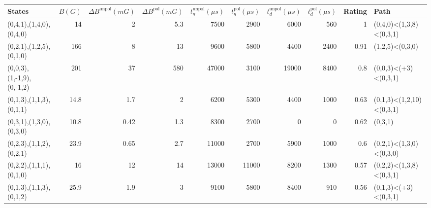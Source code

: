 \begin{tabular}{lrrrrrrrrl}
\hline
 {States}                  &   {$B(G)$} &   {$\Delta B^{\text{unpol}}(mG)$} &   {$\Delta B^{\text{pol}}(mG)$} &   {$t^{\text{unpol}}_{g}(\mu s)$} &   {$t^{\text{pol}}_{g}(\mu s)$} &   {$t^{\text{unpol}}_{d}(\mu s)$} &   {$t^{\text{pol}}_{d}(\mu s)$} &   {Rating} & {Path}                   \\
\hline
 (0,4,1),(1,4,0),(0,4,0)   &       14   &                              2    &                             5.3 &                              7500 &                            2900 &                              6000 &                             560 &       1    & (0,4,0)<(1,3,8)<(0,3,1)  \\
 (0,2,1),(1,2,5),(0,1,0)   &      166   &                              8    &                            13   &                              9600 &                            5800 &                              4400 &                            2400 &       0.91 & (1,2,5)<(0,3,0)          \\
 (0,0,3),(1,-1,9),(0,-1,2) &      201   &                             37    &                           580   &                             47000 &                            3100 &                             19000 &                            8400 &       0.8  & (0,0,3)<(+3)<(0,3,1)     \\
 (0,1,3),(1,1,3),(0,1,1)   &       14.8 &                              1.7  &                             2   &                              6200 &                            5300 &                              4400 &                            1000 &       0.63 & (0,1,3)<(1,2,10)<(0,3,1) \\
 (0,3,1),(1,3,0),(0,3,0)   &       10.8 &                              0.42 &                             1.3 &                              8300 &                            2700 &                                 0 &                               0 &       0.62 & (0,3,1)                  \\
 (0,2,3),(1,1,2),(0,2,1)   &       23.9 &                              0.65 &                             2.7 &                             11000 &                            2700 &                              5900 &                            1000 &       0.6  & (0,2,1)<(1,3,0)<(0,3,0)  \\
 (0,2,2),(1,1,1),(0,1,0)   &       16   &                             12    &                            14   &                             13000 &                           11000 &                              8200 &                            1300 &       0.57 & (0,2,2)<(1,3,8)<(0,3,1)  \\
 (0,1,3),(1,1,3),(0,1,2)   &       25.9 &                              1.9  &                             3   &                              9100 &                            5800 &                              8400 &                             910 &       0.56 & (0,1,3)<(+3)<(0,3,1)     \\
\hline
\end{tabular}